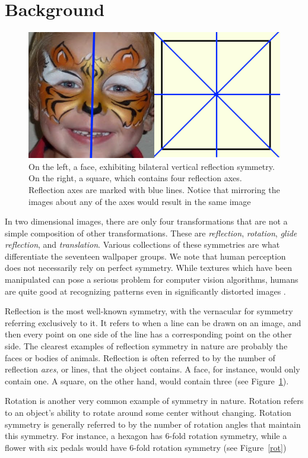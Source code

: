 \section{Background}
\begin{figure}
\centering
\includegraphics[width=0.9\columnwidth]{reflection}
\caption{On the left, a face, exhibiting bilateral vertical reflection symmetry. On the right, a square, which contains four reflection axes. Reflection axes are marked with blue lines. Notice that mirroring the images about any of the axes would result in the same image}
\label{ref}
\end{figure}

In two dimensional images, there are only four transformations that are not a simple composition of other transformations. These are \textit{reflection}, \textit{rotation}, \textit{glide reflection}, and \textit{translation}. Various collections of these symmetries are what differentiate the seventeen wallpaper groups. We note that human perception does not necessarily rely on perfect symmetry. While textures which have been manipulated can pose a serious problem for computer vision algorithms, humans are quite good at recognizing patterns even in significantly distorted images \cite{nearregular}.  

Reflection is the most well-known symmetry, with the vernacular for symmetry referring exclusively to it. It refers to when a line can be drawn on an image, and then every point on one side of the line has a corresponding point on the other side. The clearest examples of reflection symmetry in nature are probably the faces or bodies of animals. Reflection is often referred to by the number of reflection \textit{axes}, or lines, that the object contains. A face, for instance, would only contain one. A square, on the other hand, would contain three (see Figure~\ref{ref}).

Rotation is another very common example of symmetry in nature. Rotation refers to an object's ability to rotate around some center without changing. Rotation symmetry is generally referred to by the number of rotation angles that maintain this symmetry. For instance, a hexagon has 6-fold rotation symmetry, while a flower with six pedals would have 6-fold rotation symmetry (see Figure~\ref{rot})

